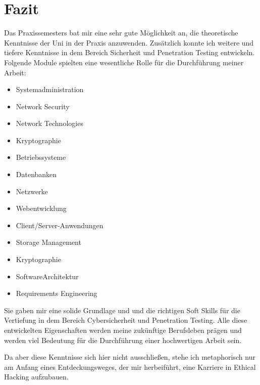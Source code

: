 \section{Fazit}

Das Praxissemesters bat mir eine sehr gute Möglichkeit an, die theoretische Kenntnisse der Uni in der Praxis anzuwenden. Zusätzlich konnte ich weitere und tiefere Kenntnisse in dem Bereich Sicherheit und Penetration Testing entwickeln. Folgende Module spielten eine wesentliche Rolle für die Durchführung meiner Arbeit:
 
\begin{itemize}
    \item Systemadministration
    \item Network Security 
    \item Network Technologies 
    \item Kryptographie
    \item Betriebssysteme
    \item Datenbanken
    \item Netzwerke
    \item Webentwicklung
    \item Client/Server-Anwendungen 
    \item Storage Management
    \item Kryptographie
    \item SoftwareArchitektur
    \item Requirements Engineering 
\end{itemize}

Sie gaben mir eine solide Grundlage und und die richtigen Soft Skills für die Vertiefung in dem Bereich Cybersicherheit und Penetration Testing. Alle diese entwickelten Eigenschaften werden meine zukünftige Berufsleben prägen und werden viel Bedeutung für die Durchführung einer hochwertigen Arbeit sein. 

Da aber diese Kenntnisse sich hier nicht ausschließen, stehe ich metaphorisch nur am Anfang eines Entdeckungsweges, der mir herbeiführt, eine Karriere in Ethical Hacking aufzubauen. 